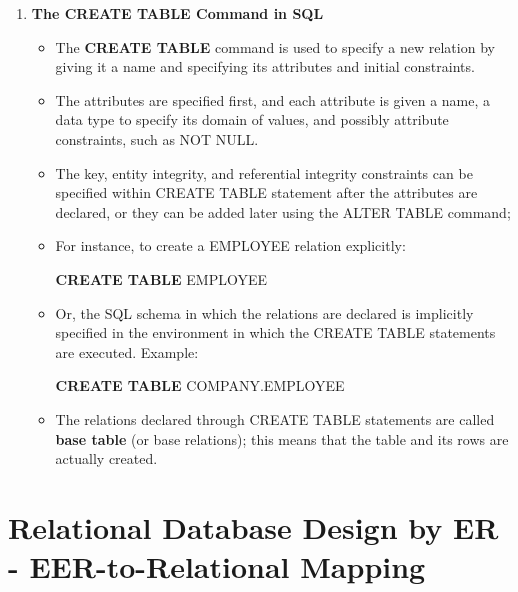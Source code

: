 \documentclass[10pt]{article}
\begin{document}
\begin{enumerate}
	\item \textbf{The CREATE TABLE Command in SQL}
	\begin{itemize}
		\item The \textbf{CREATE TABLE} command is used to specify a new relation by giving it a name and specifying its attributes and initial constraints.
		\item The attributes are specified first, and each attribute is given a name, a data type to specify its domain of values, and possibly attribute constraints, such as NOT NULL.
		\item The key, entity integrity, and referential integrity constraints can be specified within CREATE TABLE statement after the attributes are declared, or they can be added later using the ALTER TABLE command;
		\item For instance, to create a EMPLOYEE relation explicitly:
		\begin{center}
			\textbf{CREATE TABLE} EMPLOYEE
		\end{center}
		\item Or, the SQL schema in which the relations are declared is implicitly specified in the environment in which the CREATE TABLE statements are executed. Example:
		\begin{center}
			\textbf{CREATE TABLE} COMPANY.EMPLOYEE
		\end{center}
		\item The relations declared through CREATE TABLE statements are called \textbf{base table} (or base relations); this means that the table and its rows are actually created.
	\end{itemize}
\end{enumerate}

\pagebreak
\section*{Relational Database Design by ER - EER-to-Relational Mapping}
\end{document}

